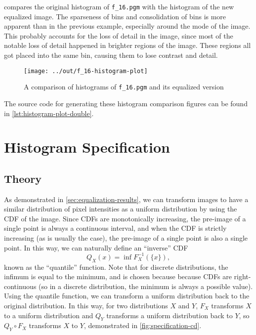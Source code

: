 \documentclass[headings=optiontoheadandtoc,listof=totoc,parskip=full]{scrartcl}
\begin{document}
 compares the original histogram of \texttt{f\_16.pgm} with the histogram of the new equalized image. The sparseness of bins and consolidation of bins is more apparent than in the previous example, especially around the mode of the image. This probably accounts for the loss of detail in the image, since most of the notable loss of detail happened in brighter regions of the image. These regions all got placed into the same bin, causing them to lose contrast and detail.

\begin{figure}[H]
	\centering\texttt{[image: ../out/f\_16-histogram-plot]}
	\caption{A comparison of histograms of \texttt{f\_16.pgm} and its equalized version}
	\label{fig:equal-histogram-2}
\end{figure}

The source code for generating these histogram comparison figures can be found in \cref{lst:histogram-plot-double}.

\section{Histogram Specification}

\subsection{Theory}
As demonstrated in \cref{sec:equalization-results}, we can transform images to have a similar distribution of pixel intensities as a uniform distribution by using the CDF of the image. Since CDFs are monotonically increasing, the pre-image of a single point is always a continuous interval, and when the CDF is strictly increasing (as is usually the case), the pre-image of a single point is also a single point. In this way, we can naturally define an ``inverse'' CDF
\begin{equation}
	Q_X(x) = \inf F_X^{-1}(\{x\}), \label{eq:quantile-func}
\end{equation}
known as the ``quantile'' function. Note that for discrete distributions, the infimum is equal to the minimum, and is chosen because because CDFs are right-continuous (so in a discrete distribution, the minimum is always a possible value). Using the quantile function, we can transform a uniform distribution back to the original distribution. In this way, for two distributions $X$ and $Y$, $F_X$ transforms $X$ to a uniform distribution and $Q_Y$ transforms a uniform distribution back to $Y$, so $Q_Y \circ F_X$ transforms $X$ to $Y$, demonstrated in  \cref{fig:specification-cd}.
\end{document}
